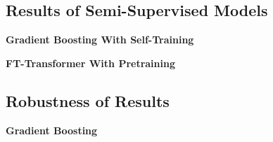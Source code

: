 
\subsection{Results of Semi-Supervised
    Models}\label{sec:results-of-semi-supervised-models}



\textbf{Gradient Boosting With Self-Training}

\textbf{FT-Transformer With Pretraining}

\subsection{Robustness of Results}\label{sec:robustness-checks}


\textbf{Gradient Boosting}

